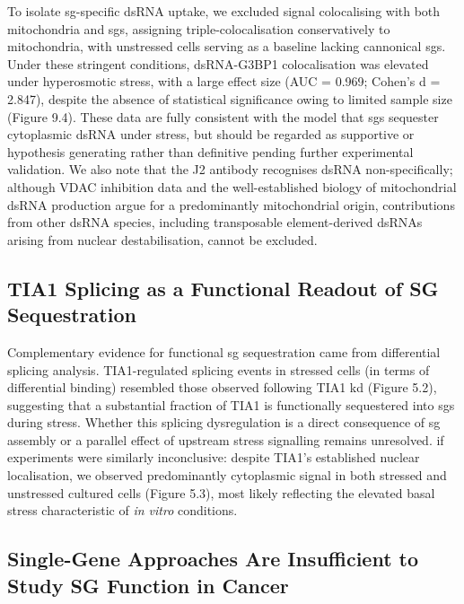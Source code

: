 To isolate \gls{sg}-specific dsRNA uptake, we excluded signal colocalising with both mitochondria and \gls{sg}s, assigning triple-colocalisation conservatively to mitochondria, with unstressed cells serving as a baseline lacking cannonical \gls{sg}s. Under these stringent conditions, dsRNA-G3BP1 colocalisation was elevated under hyperosmotic stress, with a large effect size (AUC = 0.969; Cohen's d = 2.847), despite the absence of statistical significance owing to limited sample size (Figure 9.4). These data are fully consistent with the model that \gls{sg}s sequester cytoplasmic dsRNA under stress, but should be regarded as supportive or hypothesis generating rather than definitive pending further experimental validation. We also note that the J2 antibody recognises dsRNA non-specifically; although VDAC inhibition data and the well-established biology of mitochondrial dsRNA production\cite{krieger_trafficking_2024} argue for a predominantly mitochondrial origin, contributions from other dsRNA species, including transposable element-derived dsRNAs arising from nuclear destabilisation\cite{krieger_trafficking_2024}, cannot be excluded.

\subsection{TIA1 Splicing as a Functional Readout of SG Sequestration}

Complementary evidence for functional \gls{sg} sequestration came from differential splicing analysis. TIA1-regulated splicing events in stressed cells (in terms of differential binding) resembled those observed following TIA1 \gls{kd} (Figure 5.2), suggesting that a substantial fraction of TIA1 is functionally sequestered into \gls{sg}s during stress. Whether this splicing dysregulation is a direct consequence of \gls{sg} assembly or a parallel effect of upstream stress signalling remains unresolved. \gls{if} experiments were similarly inconclusive: despite TIA1's established nuclear localisation\cite{thul_subcellular_2017}, we observed predominantly cytoplasmic signal in both stressed and unstressed cultured cells (Figure 5.3), most likely reflecting the elevated basal stress characteristic of \textit{in vitro} conditions.

\subsection{Single-Gene Approaches Are Insufficient to Study SG Function in Cancer}

